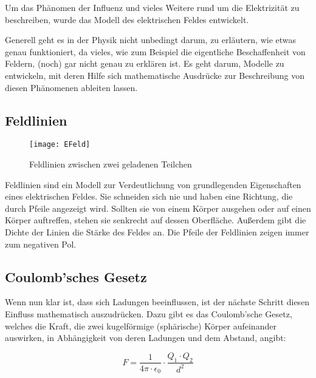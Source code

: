 Um das Phänomen der Influenz und vieles Weitere rund um die Elektrizität zu beschreiben, wurde das Modell des elektrischen Feldes entwickelt. 

\begin{NiceToKnow}
Generell geht es in der Physik nicht unbedingt darum, zu erläutern, wie etwas genau funktioniert, da vieles, wie zum Beispiel die eigentliche Beschaffenheit von Feldern, (noch) gar nicht genau zu erklären ist. Es geht darum, Modelle zu entwickeln, mit deren Hilfe sich mathematische Ausdrücke zur Beschreibung von diesen Phänomenen ableiten lassen.
\end{NiceToKnow}


\subsection{Feldlinien}

\begin{figure}
	\centering
	\texttt{[image: EFeld]}
	\caption{Feldlinien zwischen zwei geladenen Teilchen}
\end{figure}

Feldlinien sind ein Modell zur Verdeutlichung von grundlegenden Eigenschaften eines elektrischen Feldes. Sie schneiden sich nie und haben eine Richtung, die durch Pfeile angezeigt wird. Sollten sie von einem Körper ausgehen oder auf einen Körper auftreffen, stehen sie senkrecht auf dessen Oberfläche. Außerdem gibt die Dichte der Linien die Stärke des Feldes an. Die Pfeile der Feldlinien zeigen immer zum negativen Pol.


\subsection{Coulomb'sches Gesetz} \label{subsec:CoulombGesetz}

Wenn nun klar ist, dass sich Ladungen beeinflussen, ist der nächste Schritt diesen \glqq Einfluss\grqq{} mathematisch auszudrücken. Dazu gibt es das Coulomb'sche Gesetz, welches die Kraft, die zwei kugelförmige (sphärische) Körper aufeinander auswirken, in Abhängigkeit von deren Ladungen und dem Abstand, angibt:

\begin{equation} \label{eq:coulomb_gesetz}
	F = \frac{1}{4\pi \cdot \epsilon_0} \cdot \frac{Q_1 \cdot Q_2}{d^{2}}
\end{equation}

